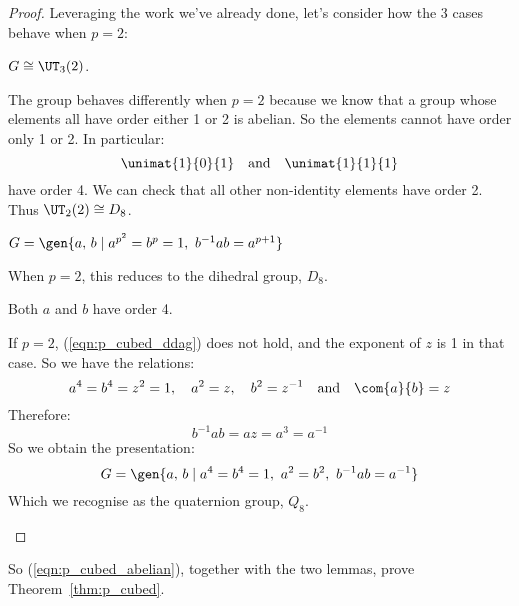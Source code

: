 \begin{proof}
Leveraging the work we've already done, let's consider how the 3 cases behave when \(p=2\):

\begin{case}
    \item \(G \cong \UT_3(2)\).

        The group behaves differently when \(p = 2\) because we know that a group whose elements all have order either 1
        or 2 is abelian.
        So the elements cannot have order only 1 or 2.
        In particular:
        \[\unimat{1}{0}{1} \quad \text{and} \quad \unimat{1}{1}{1}\]
        have order 4.
        We can check that all other non-identity elements have order 2.
        Thus \(\UT_2(2) \cong D_8\).

    \item \(G = \gen{a,\,b \mid a^{p^2} = b^p = 1,\ b^{-1}ab = a^{p + 1}}\)

        When \(p = 2\), this reduces to the dihedral group, \(D_8\).

    \item Both \(a\) and \(b\) have order 4.

        If \(p = 2\), (\ref{eqn:p_cubed_ddag}) does not hold, and the exponent of \(z\) is 1 in that case.
        So we have the relations:
        \[a^4 = b^4 = z^2 = 1, \quad a^2 = z, \quad b^2 = z^{-1} \quad \text{and} \quad \com{a}{b} = z\]
        Therefore:
        \[b^{-1}ab = az = a^3 = a^{-1}\]
        So we obtain the presentation:
        \[G = \gen{a,\,b \mid a^4 = b^4 = 1,\ a^2 = b^2,\ b^{-1}ab = a^{-1}}\]
        Which we recognise as the quaternion group, \(Q_8\).
\end{case}
\end{proof}

So (\ref{eqn:p_cubed_abelian}), together with the two lemmas, prove Theorem~\ref{thm:p_cubed}.

